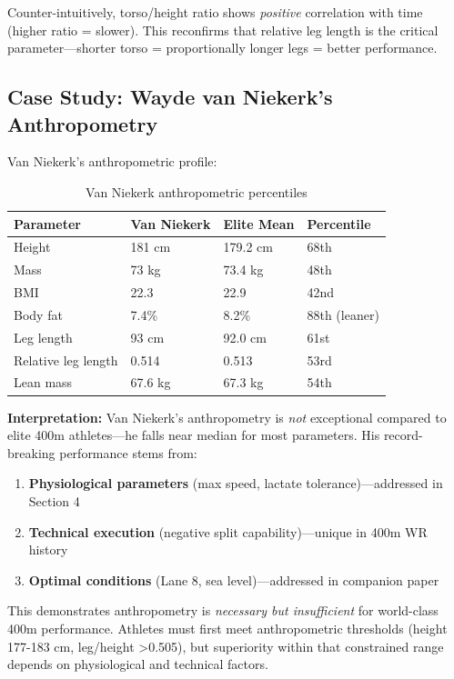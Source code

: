 Counter-intuitively, torso/height ratio shows \textit{positive} correlation with time (higher ratio = slower). This reconfirms that relative leg length is the critical parameter—shorter torso = proportionally longer legs = better performance.

\subsection{Case Study: Wayde van Niekerk's Anthropometry}

Van Niekerk's anthropometric profile:

\begin{table}[H]
\centering
\caption{Van Niekerk anthropometric percentiles}
\begin{tabular}{@{}llll@{}}
\toprule
\textbf{Parameter} & \textbf{Van Niekerk} & \textbf{Elite Mean} & \textbf{Percentile} \\
\midrule
Height & 181 cm & 179.2 cm & 68th \\
Mass & 73 kg & 73.4 kg & 48th \\
BMI & 22.3 & 22.9 & 42nd \\
Body fat & 7.4\% & 8.2\% & 88th (leaner) \\
Leg length & 93 cm & 92.0 cm & 61st \\
Relative leg length & 0.514 & 0.513 & 53rd \\
Lean mass & 67.6 kg & 67.3 kg & 54th \\
\bottomrule
\end{tabular}
\end{table}

\textbf{Interpretation:} Van Niekerk's anthropometry is \textit{not} exceptional compared to elite 400m athletes—he falls near median for most parameters. His record-breaking performance stems from:
\begin{enumerate}
    \item \textbf{Physiological parameters} (max speed, lactate tolerance)—addressed in Section 4
    \item \textbf{Technical execution} (negative split capability)—unique in 400m WR history
    \item \textbf{Optimal conditions} (Lane 8, sea level)—addressed in companion paper
\end{enumerate}

This demonstrates anthropometry is \textit{necessary but insufficient} for world-class 400m performance. Athletes must first meet anthropometric thresholds (height 177-183 cm, leg/height >0.505), but superiority within that constrained range depends on physiological and technical factors.

